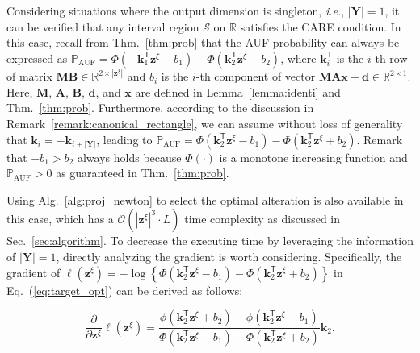 \documentclass{article}
\theoremstyle{plain}
\theoremstyle{definition}
\def \x {\mathbf{x}}
\def \M {\mathbf{M}}
\def \A {\mathbf{A}}
\def \Y{\mathbf{Y}}
\def \ie {\textit{i.e.}}
\def \Eq {Eq.}
\def \x {\mathbf{x}}
\def \sS {\mathcal{S}}
\def \Y {\mathbf{Y}}
\def \k {\mathbf{k}}
\def \M {\mathbf{M}}
\def \A {\mathbf{A}}
\def \B {\mathbf{B}}
\def \z {\mathbf{z}}
\def \d {\mathbf{d}}
\begin{document}
Considering situations where the output dimension is singleton, \ie, $|\Y|=1$, it can be verified that any interval region $\sS$ on $\mathbb{R}$ satisfies the CARE condition. 
In this case, recall from Thm.~\ref{thm:prob} that the AUF probability can always be expressed as 
\(
\mathbb{P}_{\operatorname*{AUF}} = \Phi\left(-\k_1^\mathsf{T} \z^\xi - b_1\right) - \Phi\left(\k^\mathsf{T}_{2} \z^\xi + b_{2}\right)
\), 
where $\k_i^\mathsf{T}$ is the $i$-th row of matrix $\M\B \in \mathbb{R}^{2 \times |\z^\xi|}$ and $b_i$ is the $i$-th component of vector $\M\A\x - \d \in \mathbb{R}^{2\times 1}$. 
Here, $\M$, $\A$, $\B$, $\d$, and $\x$ are defined in Lemma~\ref{lemma:identi} and Thm.~\ref{thm:prob}. 
Furthermore, according to the discussion in Remark~\ref{remark:canonical_rectangle}, we can assume without loss of generality that $\k_i = -\k_{i+|\Y|}$, leading to 
\(
\mathbb{P}_{\operatorname*{AUF}} = \Phi\left(\k_2^\mathsf{T} \z^\xi - b_1\right) - \Phi\left(\k_2^\mathsf{T} \z^\xi + b_2\right)
\). 
Remark that $-b_1 > b_2$ always holds because $\Phi(\cdot)$ is a monotone increasing function and $\mathbb{P}_{\operatorname*{AUF}} > 0$ as guaranteed in Thm.~\ref{thm:prob}.


Using Alg.~\ref{alg:proj_newton} to select the optimal alteration is also available in this case, which has a $\mathcal{O}(|\z^\xi|^3\cdot L)$ time complexity as discussed in Sec.~\ref{sec:algorithm}.
 To decrease the executing time by leveraging the information of $|\Y|=1$, directly analyzing the gradient is worth considering. 
 Specifically, the gradient of $\ell(\z^\xi)=-\log\left\{ \Phi\left(\k_2^\mathsf{T} \z^\xi - b_1\right) - \Phi\left(\k_2^\mathsf{T} \z^\xi + b_2\right) \right\}$ in \Eq~(\ref{eq:target_opt}) can be derived as follows:

\vspace{-4mm}
\begin{equation}
  \label{eq:1d-target}
  \frac{\partial}{\partial \z^\xi} \ell(\z^\xi)=\frac{\phi\left(\k_2^\mathsf{T} \z^\xi + b_2\right) - \phi\left(\k_2^\mathsf{T} \z^\xi - b_1\right)}{\Phi\left(\k_2^\mathsf{T} \z^\xi - b_1\right) - \Phi\left(\k_2^\mathsf{T} \z^\xi + b_2\right)} \k_2.
\end{equation}
\end{document}

